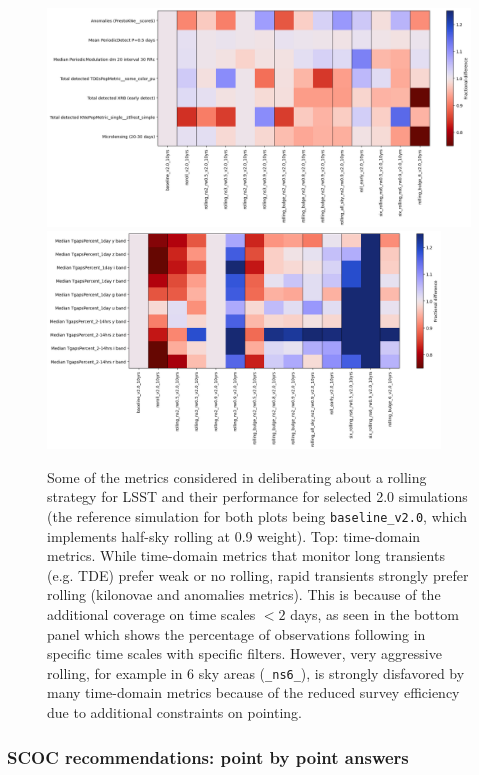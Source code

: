  \begin{figure}
    \includegraphics[width=\textwidth, right]{figures/roll_tvs.png}
     \includegraphics[width=0.93\textwidth, right]{figures/roll_tgaps.png}\caption{Some of the metrics considered in deliberating about a rolling strategy for LSST and their performance for selected 2.0 simulations (the reference simulation for both plots being \texttt{baseline\_v2.0}, which implements half-sky rolling at 0.9 weight). Top: time-domain metrics. While time-domain metrics that monitor long transients (e.g. TDE) prefer weak or no rolling, rapid transients strongly prefer rolling (kilonovae and anomalies metrics). This is because of the additional coverage on time scales $<2$ days, as seen in the bottom panel which shows the percentage of observations following in specific time scales with specific filters. However, very aggressive rolling, for example in 6 sky areas (\texttt{\_ns6\_}), is strongly disfavored by many time-domain metrics because of the reduced survey efficiency due to additional constraints on pointing.}
     \label{fig:knroll}
 \end{figure}

 \subsubsection{SCOC recommendations: point by point answers}\label{sec:rolling_points}
 


